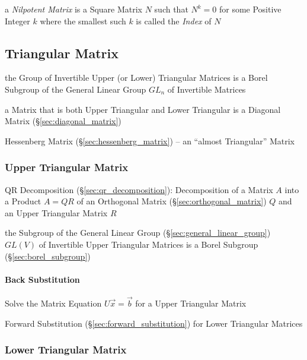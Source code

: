 a \emph{Nilpotent Matrix} is a Square Matrix $N$ such that $N^k = 0$ for some
Positive Integer $k$ where the smallest such $k$ is called the \emph{Index} of
$N$



\subsection{Triangular Matrix}\label{sec:triangular_matrix}

the Group of Invertible Upper (or Lower) Triangular Matrices is a Borel
Subgroup of the General Linear Group $GL_n$ of Invertible Matrices

a Matrix that is both Upper Triangular and Lower Triangular is a Diagonal
Matrix (\S\ref{sec:diagonal_matrix})

\fist Hessenberg Matrix (\S\ref{sec:hessenberg_matrix}) -- an ``almost
Triangular'' Matrix



\subsubsection{Upper Triangular Matrix}\label{sec:upper_triangular}

QR Decomposition (\S\ref{sec:qr_decomposition}): Decomposition of a Matrix $A$
into a Product $A = QR$ of an Orthogonal Matrix (\S\ref{sec:orthogonal_matrix})
$Q$ and an Upper Triangular Matrix $R$

the Subgroup of the General Linear Group (\S\ref{sec:general_linear_group})
$GL(V)$ of Invertible Upper Triangular Matrices is a Borel Subgroup
(\S\ref{sec:borel_subgroup})



\paragraph{Back Substitution}\label{sec:back_substitution}\hfill

Solve the Matrix Equation $U\vec{x} = \vec{b}$ for a Upper Triangular Matrix

\fist Forward Substitution (\S\ref{sec:forward_substitution}) for Lower
Triangular Matrices



\subsubsection{Lower Triangular Matrix}\label{sec:lower_triangular}

